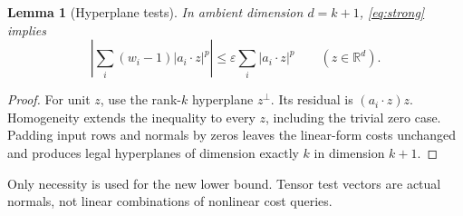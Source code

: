 \documentclass[11pt]{article}
\newtheorem{lemma}[theorem]{Lemma}
\theoremstyle{remark}\newtheorem{remark}[theorem]{Remark}
\newcommand{\R}{\mathbb R}\newcommand{\E}{\mathbb E}\newcommand{\Prob}{\mathbb P}
\newcommand{\eps}{\varepsilon}\newcommand{\norm}[1]{\left\|#1\right\|}
\begin{document}
\begin{lemma}[Hyperplane tests]\label{lem:hyperplane}
In ambient dimension $d=k+1$, \eqref{eq:strong} implies
\begin{equation}\label{eq:linear}
 \left|\sum_i(w_i-1)|a_i\cdot z|^p\right|
 \le\eps\sum_i|a_i\cdot z|^p\qquad(z\in\R^d).
\end{equation}
\end{lemma}
\begin{proof}
For unit $z$, use the rank-$k$ hyperplane $z^\perp$. Its residual is $(a_i\cdot z)z$. Homogeneity extends the inequality to every $z$, including the trivial zero case. Padding input rows and normals by zeros leaves the linear-form costs unchanged and produces legal hyperplanes of dimension exactly $k$ in dimension $k+1$.
\end{proof}
Only necessity is used for the new lower bound. Tensor test vectors are actual normals, not linear combinations of nonlinear cost queries.
\end{document}
